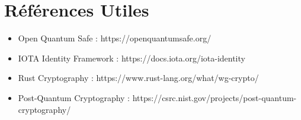 \documentclass[12pt,a4paper]{report}
\begin{document}
\section{Références Utiles}

\begin{itemize}
  \item Open Quantum Safe : https://openquantumsafe.org/
  \item IOTA Identity Framework : https://docs.iota.org/iota-identity
  \item Rust Cryptography : https://www.rust-lang.org/what/wg-crypto/
  \item Post-Quantum Cryptography : https://csrc.nist.gov/projects/post-quantum-cryptography/
\end{itemize}
\end{document}
